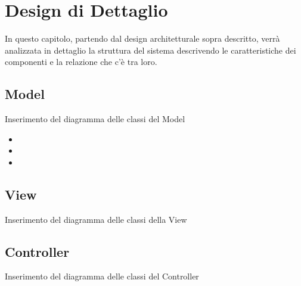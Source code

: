 \chapter{Design di Dettaglio}
In questo capitolo, partendo dal design architetturale sopra descritto, verrà analizzata in dettaglio la struttura del sistema descrivendo le caratteristiche dei componenti e la relazione che c'è tra loro.

    \section{Model}
    Inserimento del diagramma delle classi del Model
        \begin{itemize}
            \item 
            \item 
            \item 
        \end{itemize}
    \section{View}
    Inserimento del diagramma delle classi della View
    
    \section{Controller}
    Inserimento del diagramma delle classi del Controller